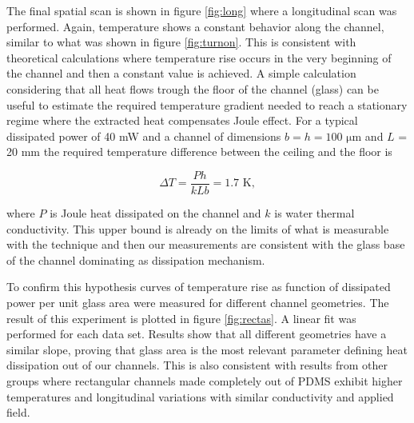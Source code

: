 \documentclass[twocolumn]{svjour3}       %
\begin{document}
The final spatial scan is shown in figure \ref{fig:long} where a longitudinal scan was performed. Again, temperature shows a constant behavior along the channel, similar to what was shown in figure \ref{fig:turnon}. This is consistent with theoretical calculations \cite{jouleteorico} where temperature rise occurs in the very beginning of the channel and then a constant value is achieved. A simple calculation considering that all heat flows trough the floor of the channel (glass) can be useful to estimate the required temperature gradient needed to reach a stationary regime where the extracted heat compensates Joule effect. For a typical dissipated power of 40 mW and a channel of dimensions $b = h = 100$ $\mathrm{\mu m}$ and $L$ = 20 mm the required temperature difference between the ceiling and the floor is 

\begin{equation}
\Delta T = \frac{Ph}{kLb} = 1.7\,\, \mathrm{K},
\end{equation}

where $P$ is Joule heat dissipated on the channel and $k$ is water thermal conductivity. This upper bound is already on the limits of what is measurable with the technique and then our measurements are consistent with the glass base of the channel dominating as dissipation mechanism. 

To confirm this hypothesis curves of temperature rise as function of dissipated power per unit glass area were measured for different channel geometries. The result of this experiment is plotted in figure \ref{fig:rectas}. A linear fit was performed for each data set. Results show that all different geometries have a similar slope, proving that glass area is the most relevant parameter defining heat dissipation out of our channels. This is also consistent with results from other groups \cite{competencia1} where rectangular channels made completely out of PDMS exhibit higher temperatures and longitudinal variations with similar conductivity and applied field. 





\end{document}
